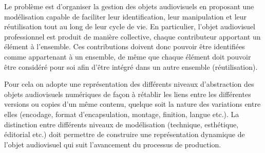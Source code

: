 


 Le problème est d'organiser la gestion des objets audiovisuels en proposant une modélisation capable de faciliter leur identification, leur manipulation et leur réutilisation tout au long de leur cycle de vie. 
En particulier,	l'objet audiovisuel professionnel est produit de manière collective, chaque contributeur apportant un élément à l'ensemble. 
Ces contributions doivent donc pouvoir être identifiées comme appartenant à un ensemble, de même que chaque élément doit pouvoir être considéré pour soi afin d'être intégré dans un autre ensemble (réutilisation).

Pour cela on adopte une représentation des différents niveaux d'abstraction des objets audiovisuels numériques de façon à rétablir les liens entre les différentes versions ou copies d'un même contenu, quelque soit la nature des variations entre elles (encodage, format d'encapsulation, montage, finition, langue etc.).
La distinction entre différents niveaux de modélisation (technique, esthétique, éditorial etc.) doit permettre de construire une représentation dynamique de l'objet audiovisuel qui suit l'avancement du processus de production.\\


